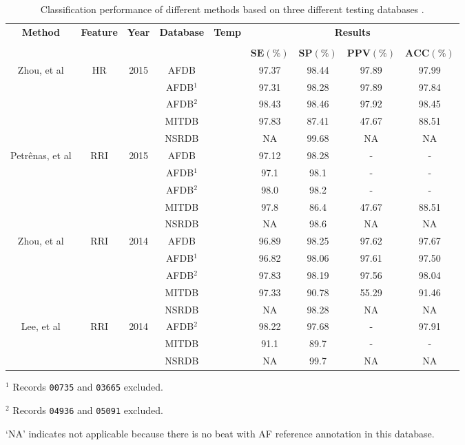 \begin{table}[h]
\begin{threeparttable}
\caption[Performance comparison of some state of the art methods.]{Classification performance of different methods based on three different testing databases \cite[p. 8]{zhou2015}.}
\label{table:zhou_hr_rri}
\scriptsize
  \begin{tabularx}{\linewidth}{c c c c X c c c c}
  \toprule
  \textbf{Method} & \textbf{Feature} & \textbf{Year} & \textbf{Database} & \textbf{Temp} & \multicolumn{4}{c}{\textbf{Results}} \\
  \cline{6-9}
  \\
  & & & & & $\mathbf{SE(\%)}$ & $\mathbf{SP(\%)}$ & $\mathbf{PPV(\%)}$ & $\mathbf{ACC(\%)}$\\
  \midrule  
  Zhou, et al\cite{zhou2015} & HR & 2015 & AFDB & & 97.37 & 98.44 & 97.89 & 97.99\\
  & & & AFDB$^1$ & & 97.31 & 98.28 & 97.89 & 97.84 \\
  & & & AFDB$^2$ & & 98.43 & 98.46 & 97.92 & 98.45 \\
  & & & MITDB & & 97.83 & 87.41 & 47.67 & 88.51 \\
  & & & NSRDB & & NA & 99.68 & NA & NA \\
  \hline
  Petrênas, et al\cite{petrenas2015} & RRI & 2015 & AFDB & & 97.12 & 98.28 & - & -\\
  & & & AFDB$^1$ & & 97.1 & 98.1 & - & - \\
  & & & AFDB$^2$ & & 98.0 & 98.2 & - & - \\
  & & & MITDB & & 97.8 & 86.4 & 47.67 & 88.51 \\
  & & & NSRDB & & NA & 98.6 & NA & NA \\
  \hline
  Zhou, et al\cite{zhou2014} & RRI & 2014 & AFDB & & 96.89 & 98.25 & 97.62 & 97.67\\
  & & & AFDB$^1$ & & 96.82 & 98.06 & 97.61 & 97.50 \\
  & & & AFDB$^2$ & & 97.83 & 98.19 & 97.56 & 98.04 \\
  & & & MITDB & & 97.33 & 90.78 & 55.29 & 91.46 \\
  & & & NSRDB & & NA & 98.28 & NA & NA \\
  \hline
  Lee, et al\cite{lee2013} & RRI & 2014 & AFDB$^2$ & & 98.22 & 97.68 & - & 97.91\\
  & & & MITDB & & 91.1 & 89.7 & - & - \\
  & & & NSRDB & & NA & 99.7 & NA & NA \\
  \bottomrule
\end{tabularx}
\begin{tablenotes}
 	\item $^1$ Records \verb|00735| and \verb|03665| excluded.
	\item $^2$ Records \verb|04936| and \verb|05091| excluded.
	\item ‘NA’ indicates not applicable because there is no beat with AF reference annotation in this database.
    \end{tablenotes}
\end{threeparttable}
\end{table}

